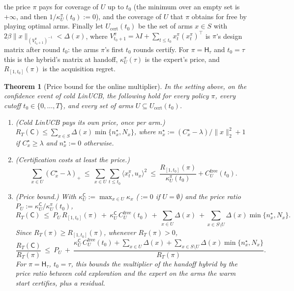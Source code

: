 \documentclass{article}
\newtheorem{theorem}{Theorem}
\theoremstyle{definition}
\theoremstyle{remark}
\theoremstyle{remark}
\newcommand{\Cold}{\mathsf{C}}
\newcommand{\Hyb}{\mathsf{H}}
\begin{document}
the price $\pi$ pays for coverage of $U$ up to $t_0$ (the minimum over an
empty set is $+\infty$, and then $1/\kappa^\pi_U(t_0):=0$), and the coverage of $U$
that $\pi$ obtains for free by playing optimal arms. Finally let
$U_{\mathrm{cert}}(t_0)$ be the set of arms $x\in S$ with
$2\beta\|x\|_{(V^\pi_{t_0+1})^{-1}}<\Delta(x)$, where
$V^\pi_{t_0+1}=\lambda I+\sum_{t\le t_0}x^\pi_t (x^\pi_t)^\top$ is $\pi$'s design
matrix after round $t_0$: the arms $\pi$'s first $t_0$ rounds certify.
For $\pi=\Hyb_\tau$ and $t_0=\tau$ this is the hybrid's matrix at handoff,
$\kappa^\pi_U(\tau)$ is the expert's price, and $R_{[1,t_0]}(\pi)$ is the acquisition
regret.

\begin{theorem}[Price bound for the online multiplier]
\label{thm:general-price}
In the setting above, on the confidence event of cold LinUCB, the following
hold for every policy $\pi$, every cutoff $t_0\in\{0,\dots,T\}$, and every
set of arms $U\subseteq U_{\mathrm{cert}}(t_0)$.
\begin{enumerate}[itemsep=1pt,topsep=1pt,leftmargin=*]
\item[(a)] \emph{(Cold LinUCB pays its own price, once per arm.)}
$R_T(\Cold)\le\sum_{x\in S}\Delta(x)\min\{n^\star_x,N_x\}$, where
$n^\star_x:=(C^\star_x-\lambda)/\|x\|_2^2+1$ if $C^\star_x\ge\lambda$ and $n^\star_x:=0$ otherwise.
\item[(b)] \emph{(Certification costs at least the price.)}
\[
\sum_{x\in U}(C^\star_x-\lambda)_+\ \le\ \sum_{x\in U}\sum_{t\le t_0}\langle x^\pi_t,u_x\rangle^2
\ \le\ \frac{R_{[1,t_0]}(\pi)}{\kappa^\pi_U(t_0)}+C^{\mathrm{free}}_U(t_0).
\]
\item[(c)] \emph{(Price bound.)} With $\kappa^{\Cold}_U:=\max_{x\in U}\kappa_x$
($:=0$ if $U=\emptyset$) and the price ratio
$P_U:=\kappa^{\Cold}_U/\kappa^\pi_U(t_0)$,
\[
R_T(\Cold)\ \le\ P_U\,R_{[1,t_0]}(\pi)\ +\ \kappa^{\Cold}_U\,C^{\mathrm{free}}_U(t_0)\ +\ \sum_{x\in U}\Delta(x)
\ +\sum_{x\in S\setminus U}\Delta(x)\min\{n^\star_x,N_x\}.
\]
Since $R_T(\pi)\ge R_{[1,t_0]}(\pi)$, whenever $R_T(\pi)>0$,
\begin{equation}
\label{eq:general-price}
\frac{R_T(\Cold)}{R_T(\pi)}\ \le\ P_U\ +\
\frac{\kappa^{\Cold}_U\,C^{\mathrm{free}}_U(t_0)+\sum_{x\in U}\Delta(x)+\sum_{x\in S\setminus U}\Delta(x)\min\{n^\star_x,N_x\}}{R_T(\pi)} .
\end{equation}
For $\pi=\Hyb_\tau$, $t_0=\tau$, this bounds the multiplier of the handoff
hybrid by the price ratio between cold exploration and the expert on the
arms the warm start certifies, plus a residual.
\end{enumerate}
\end{theorem}
\end{document}
